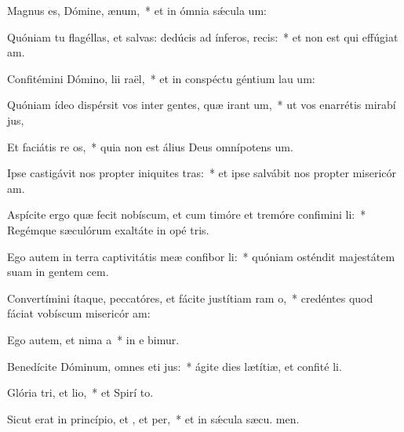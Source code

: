 \item Magnus es, Dómine,  ænum,~* et in ómnia sǽcula  um:
\item Quóniam tu flagéllas, et salvas: dedúcis ad ínferos,  recis:~* et non est qui effúgiat  am.
\item Confitémini Dómino, lii raël,~* et in conspéctu géntium lau um:
\item Quóniam ídeo dispérsit vos inter gentes, quæ irant um,~* ut vos enarrétis mirabí jus,
\item Et faciátis re os,~* quia non est álius Deus omnípotens  um.
\item Ipse castigávit nos propter iniquites tras:~* et ipse salvábit nos propter misericór am.
\item Aspícite ergo quæ fecit nobíscum, et cum timóre et tremóre confimini li:~* Regémque sæculórum exaltáte in opé tris.
\item Ego autem in terra captivitátis meæ confibor li:~* quóniam osténdit majestátem suam in gentem cem.
\item Convertímini ítaque, peccatóres, et fácite justítiam ram o,~* credéntes quod fáciat vobíscum misericór am:
\item Ego autem, et nima a~* in e bimur.
\item Benedícite Dóminum, omnes eti jus:~* ágite dies lætítiæ, et confité li.
\item Glória tri, et lio,~* et Spirí to.
\item Sicut erat in princípio, et , et per,~* et in sǽcula sæcu. men.
